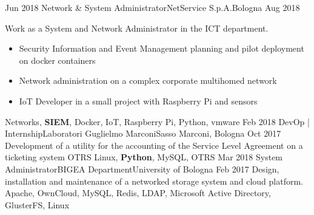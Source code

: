 %
%
%

\begin{experiences}
  \experience
  {Jun 2018} {Network \& System Administrator}{NetService S.p.A.}{Bologna}
  {Aug 2018}    {
                    Work as a System and Network Administrator in the ICT department.
                    \begin{itemize}
                      \item Security Information and Event Management planning and pilot deployment on docker containers
                      \item Network administration on a complex corporate multihomed network 
                      \item IoT Developer in a small project with Raspberry Pi and sensors
                    \end{itemize}
                  }
                  {Networks, \textbf{SIEM}, Docker, IoT, Raspberry Pi, Python, vmware}
\emptySeparator
  \experience
    {Feb 2018} {DevOp | Internship}{Laboratori Guglielmo Marconi}{Sasso Marconi, Bologna}
    {Oct 2017}    {
                      Development of a utility for the accounting of the Service Level Agreement on a ticketing system OTRS
                    }
                    {Linux, \textbf{Python}, MySQL, OTRS}
  \emptySeparator
  \experience
    {Mar 2018}   {System Administrator}{BIGEA Department}{University of Bologna}
    {Feb 2017} {
                    Design, installation and maintenance of a networked storage system and cloud platform.
                    }
                    {Apache, OwnCloud, MySQL, Redis, LDAP, Microsoft Active Directory, GlusterFS, Linux}
\emptySeparator
\end{experiences}